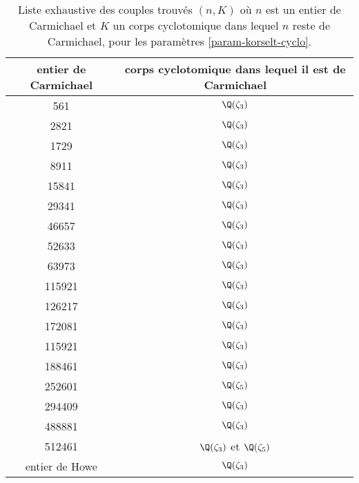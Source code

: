 \begin{table}[H]
	\begin{center}
		\begin{tabular}{|c|c|}
			\hline
			entier de Carmichael & corps cyclotomique dans lequel il est de Carmichael \\
			\hline
			\hline
			561				& $\Q(\zeta_3)$ \\\hline
			2821			& $\Q(\zeta_3)$ \\\hline
			1729			& $\Q(\zeta_3)$ \\\hline
			8911			& $\Q(\zeta_3)$ \\\hline
			15841			& $\Q(\zeta_3)$ \\\hline
			29341			& $\Q(\zeta_3)$ \\\hline
			46657			& $\Q(\zeta_3)$ \\\hline
			52633			& $\Q(\zeta_3)$ \\\hline
			63973			& $\Q(\zeta_3)$ \\\hline
			115921			& $\Q(\zeta_3)$ \\\hline
			126217			& $\Q(\zeta_3)$ \\\hline
			172081			& $\Q(\zeta_3)$ \\\hline
			115921			& $\Q(\zeta_3)$ \\\hline
			188461			& $\Q(\zeta_3)$ \\\hline
			252601			& $\Q(\zeta_5)$ \\\hline
			294409			& $\Q(\zeta_3)$ \\\hline
			488881			& $\Q(\zeta_3)$ \\\hline
			512461			& $\Q(\zeta_3)$ et $\Q(\zeta_5)$ \\\hline
			entier de Howe	& $\Q(\zeta_3)$ \\\hline
		\end{tabular}
	\end{center}
	\caption{Liste exhaustive des couples trouvés $(n, K)$ où $n$ est un entier de Carmichael et $K$ un corps cyclotomique dans lequel $n$ reste de Carmichael, pour les paramètres \ref{param-korselt-cyclo}.}
\end{table}

